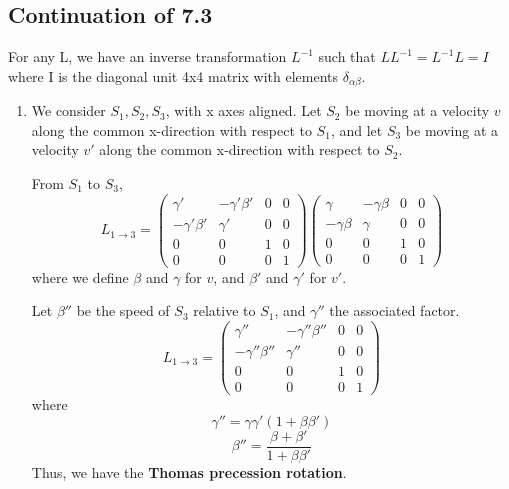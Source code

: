 \documentclass{article}
\begin{document}
	\subsection*{Continuation of 7.3}
	For any L, we have an inverse transformation $L^{-1}$ such that $L L^{-1} = L^{-1} L = I$ where I is the diagonal unit 4x4 matrix with elements $\delta_{\alpha\beta}$.
	
	\begin{enumerate}
		\item We consider $S_1, S_2, S_3$, with x axes aligned. Let $S_2$ be moving at a velocity $v$ along the common x-direction with respect to $S_1$, and let $S_3$ be moving at a velocity $v'$ along the common x-direction with respect to $S_2$.
		
		From $S_1$ to $S_3$,
		\[ L_{1 \to 3} = 
		\begin{pmatrix}
			\gamma' & -\gamma'\beta' & 0 & 0 \\
			-\gamma'\beta' & \gamma' & 0 & 0 \\
			0 & 0 & 1 & 0 \\
			0 & 0 & 0 & 1
		\end{pmatrix}
		\begin{pmatrix}
			\gamma & -\gamma\beta & 0 & 0 \\
			-\gamma\beta & \gamma & 0 & 0 \\
			0 & 0 & 1 & 0 \\
			0 & 0 & 0 & 1
		\end{pmatrix}
		\]
		where we define $\beta$ and $\gamma$ for $v$, and $\beta'$ and $\gamma'$ for $v'$.
		
		Let $\beta''$ be the speed of $S_3$ relative to $S_1$, and $\gamma''$ the associated factor.
		\[ L_{1 \to 3} = 
		\begin{pmatrix}
			\gamma'' & -\gamma''\beta'' & 0 & 0 \\
			-\gamma''\beta'' & \gamma'' & 0 & 0 \\
			0 & 0 & 1 & 0 \\
			0 & 0 & 0 & 1
		\end{pmatrix}
		\]
		where
		\[ \gamma'' = \gamma\gamma'(1+\beta\beta') \]
		\[ \beta'' = \frac{\beta+\beta'}{1+\beta\beta'} \]
		Thus, we have the \textbf{Thomas precession rotation}.
		

\end{enumerate}
\end{document}
